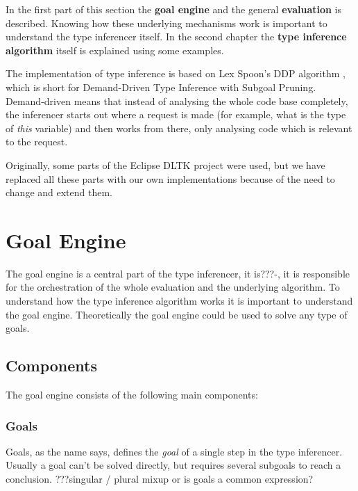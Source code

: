 \documentclass[12pt,halfparskip,DIV11,BCOR10mm]{scrreprt}
\begin{document}
In the first part of this section the \textbf{goal engine} and the general \textbf{evaluation} is described. Knowing how these underlying mechanisms work is important to understand the type inferencer itself. In the second chapter the \textbf{type inference algorithm} itself is explained using some examples.

The implementation of type inference is based on Lex Spoon's DDP algorithm \cite{ddp}, which is short for Demand-Driven Type Inference with Subgoal Pruning. Demand-driven means that instead of analysing the whole code base completely, the inferencer starts out where a request is made (for example, what is the type of \emph{this} variable) and then works from there, only analysing code which is relevant to the request.

Originally, some parts of the Eclipse DLTK project \cite{dltk} were used, but we have replaced all these parts with our own implementations because of the need to change and extend them.

\section{Goal Engine}


The goal engine is a central part of the type inferencer, it is???-, it is responsible for the orchestration of the whole evaluation and the underlying algorithm. To understand how the type inference algorithm works it is important to understand the goal engine. Theoretically the goal engine could be used to solve any type of goals.

\subsection{Components}

The goal engine consists of the following main components:

\subsubsection{Goals}

Goals, as the name says, defines the \emph{goal} of a single step in the type inferencer. Usually a goal can't be solved directly, but requires several subgoals to reach a conclusion. ???singular / plural mixup or is goals a common expression?
\end{document}
